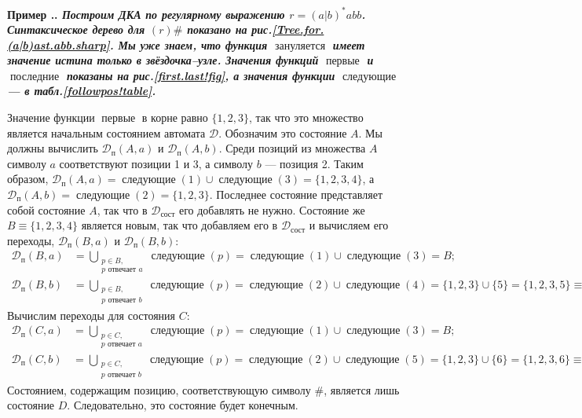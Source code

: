 \documentclass[10pt]{report}
\newcounter{exam}[section]
\renewcommand{\theexam}{\thesection.\arabic{exam}}
\newenvironment{Example}{\par\refstepcounter{exam}\bf Пример \theexam. \sl}{\rm\par}
\newcommand{\nullable}{\mathop{\textit{зануляется}}}
\newcommand{\firstpos}{\mathop{\textit{первые}}}
\newcommand{\lastpos}{\mathop{\textit{последние}}}
\newcommand{\followpos}{\mathop{\textit{следующие}}}
\begin{document}
\begin{Example}
Построим ДКА по регулярному выражению $r=(a|b)^*abb$. Синтаксическое дерево для $(r)\#$ показано на рис.\ref{Tree.for.(a|b)ast.abb.sharp}. Мы уже знаем, что функция $\nullable$ имеет
значение \textbf{истина} только в звёздочка--узле. Значения функций $\firstpos$ и $\lastpos$ показаны на рис.\ref{first.last!fig}, а значения функции $\followpos$ --- в
табл.\ref{followpos!table}.

Значение функции $\firstpos$ в корне равно $\{1,2,3\}$, так что это множество является начальным состоянием автомата $\mathcal{D}$. Обозначим это состояние $A$. Мы должны вычислить
$\mathcal{D}_{\text{п}}(A,a)$ и $\mathcal{D}_{\text{п}}(A,b)$. Среди позиций из множества $A$ символу $a$ соответствуют позиции 1 и 3, а символу $b$ --- позиция 2. Таким образом,
$\mathcal{D}_{\text{п}}(A,a)=\followpos(1)\cup\followpos(3)=\{1,2,3,4\}$, а $\mathcal{D}_{\text{п}}(A,b)=\followpos(2)=\{1,2,3\}$. Последнее состояние представляет собой состояние $A$,
так что в $\mathcal{D}_{\text{сост}}$ его добавлять не нужно. Состояние же $B\equiv\{1,2,3,4\}$ является новым, так что добавляем его в $\mathcal{D}_{\text{сост}}$ и вычисляем его переходы,
$\mathcal{D}_{\text{п}}(B,a)$ и $\mathcal{D}_{\text{п}}(B,b)$:
\begin{align*}
\mathcal{D}_{\text{п}}(B,a) &=\bigcup\limits_{\substack{p\in B,\\ p \text{ отвечает } a}}\!\!\!\!\followpos(p)=\followpos(1)\cup\followpos(3)=B;\\
\mathcal{D}_{\text{п}}(B,b) &=\bigcup\limits_{\substack{p\in B,\\ p \text{ отвечает } b}}\!\!\!\!\followpos(p)=\followpos(2)\cup\followpos(4)=\{1,2,3\}\cup\{5\}=\{1,2,3,5\}\equiv C.
\end{align*}
Вычислим переходы для состояния $C$:
\begin{align*}
\mathcal{D}_{\text{п}}(C,a) &=\bigcup\limits_{\substack{p\in C,\\ p \text{ отвечает } a}}\!\!\!\!\followpos(p)=\followpos(1)\cup\followpos(3)=B;\\
\mathcal{D}_{\text{п}}(C,b) &=\bigcup\limits_{\substack{p\in C,\\ p \text{ отвечает } b}}\!\!\!\!\followpos(p)=\followpos(2)\cup\followpos(5)=\{1,2,3\}\cup\{6\}=\{1,2,3,6\}\equiv D.
\end{align*}
Состоянием, содержащим позицию, соответствующую символу $\#$, является лишь состояние $D$. Следовательно, это состояние будет конечным.


\end{Example}
\end{document}
